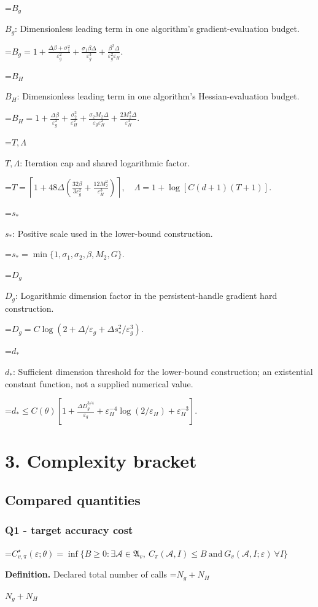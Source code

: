 \documentclass[10pt,a4paper]{article}
\newcommand{\AtlasMath}[1]{\par\begingroup\centering\setbox0=\hbox{$\displaystyle #1$}\ifdim\wd0>1.4\linewidth\typeout{ATLAS WIDE FORMULA: \the\wd0}\fi\ifdim\wd0>\linewidth\resizebox{\linewidth}{!}{\box0}\else\box0\fi\par\endgroup}
\newcommand{\AtlasInlineMath}[1]{\begingroup\setbox0=\hbox{$#1$}\ifdim\wd0>.4\linewidth\endgroup\AtlasMath{#1}\else\endgroup$#1$\fi}
\begin{document}
\AtlasInlineMath{B_g}: Dimensionless leading term in one algorithm's gradient-evaluation budget.


\AtlasMath{B_g=1+\frac{\Delta\beta+\sigma_1^2}{\varepsilon_g^2}+\frac{\sigma_1\beta\Delta}{\varepsilon_g^3}+\frac{\beta^2\Delta}{\varepsilon_g^2\varepsilon_H}.}


\AtlasInlineMath{B_H}: Dimensionless leading term in one algorithm's Hessian-evaluation budget.


\AtlasMath{B_H=1+\frac{\Delta\beta}{\varepsilon_g^2}+\frac{\sigma_2^2}{\varepsilon_H^2}+\frac{\sigma_2M_2\Delta}{\varepsilon_g\varepsilon_H^2}+\frac{2M_2^2\Delta}{\varepsilon_H^3}.}


\AtlasInlineMath{T,\Lambda}: Iteration cap and shared logarithmic factor.


\AtlasMath{T=\left\lceil1+48\Delta\left(\frac{32\beta}{3\varepsilon_g^2}+\frac{12M_2^2}{\varepsilon_H^3}\right)\right\rceil,\quad\Lambda=1+\log[C(d+1)(T+1)].}


\AtlasInlineMath{s_*}: Positive scale used in the lower-bound construction.


\AtlasMath{s_*=\min\{1,\sigma_1,\sigma_2,\beta,M_2,G\}.}


\AtlasInlineMath{D_g}: Logarithmic dimension factor in the persistent-handle gradient hard construction.


\AtlasMath{D_g=C\log(2+\Delta/\varepsilon_g+\Delta s_*^2/\varepsilon_g^3).}


\AtlasInlineMath{d_*}: Sufficient dimension threshold for the lower-bound construction; an existential constant function, not a supplied numerical value.


\AtlasMath{d_*\le C(\theta)\left[1+\frac{\Delta D_g^{3/4}}{\varepsilon_g}+\varepsilon_H^{-4}\log(2/\varepsilon_H)+\varepsilon_H^{-3}\right].}


\section{3. Complexity bracket}
\subsection{Compared quantities}
\subsubsection{Q1 - target accuracy cost}
\AtlasMath{C^\star_{v,\pi}(\varepsilon;\theta)=\inf\{B\ge0:\exists\mathcal A\in\mathfrak A_v,\ C_\pi(\mathcal A,I)\le B\ \text{and}\ G_v(\mathcal A,I;\varepsilon)\ \forall I\}}
\textbf{Definition.} Declared total number of calls \AtlasInlineMath{N_g+N_H}
\end{document}
